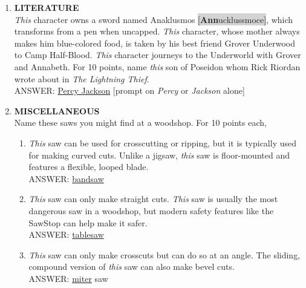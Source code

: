 \documentclass{report}
\newcommand*{\backtrack}{\setcounter{enumi}{\numexpr\theenumi-1\relax}}
\begin{document}
\begin{enumerate}
    \item \textbf{LITERATURE} \\ \textit{This} character owns a sword named Anaklusmos \colorbox{lightGray}{[\textbf{Ann}\textperiodcentered uck\textperiodcentered luss\textperiodcentered moce]}, which transforms from a pen when uncapped. \textit{This} character, whose mother always makes him blue-colored food, is taken by his best friend Grover Underwood to Camp Half-Blood. \textit{This} character journeys to the Underworld with Grover and Annabeth. For 10 points, name \textit{this} son of Poseidon whom Rick Riordan wrote about in \textit{The Lightning Thief}. \\ ANSWER: \underline{Percy Jackson} [prompt on \textit{Percy} or \textit{Jackson} alone] \backtrack
    \item \textbf{MISCELLANEOUS} \\ Name these saws you might find at a woodshop. For 10 points each,
    \begin{enumerate}[label=\Alph*]
        \item \textit{This} saw can be used for crosscutting or ripping, but it is typically used for making curved cuts. Unlike a jigsaw, \textit{this} saw is floor-mounted and features a flexible, looped blade. \\ ANSWER: \underline{bandsaw}
        \item \textit{This} saw can only make straight cuts. \textit{This} saw is usually the most dangerous saw in a woodshop, but modern safety features like the SawStop can help make it safer. \\ ANSWER: \underline{tablesaw}
        \item \textit{This} saw can only make crosscuts but can do so at an angle. The sliding, compound version of \textit{this} saw can also make bevel cuts. \\ ANSWER: \underline{miter} saw
    \end{enumerate}


\end{enumerate}
\end{document}
